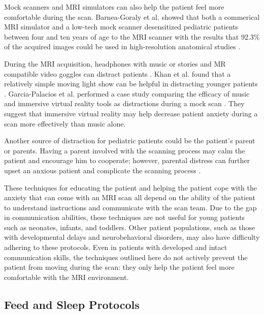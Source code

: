 Mock scanners and MRI simulators can also help the patient feel more comfortable during the scan. Barnea-Goraly et al. showed that both a commerical MRI simulator and a low-tech mock scanner desensitized pediatric patients between four and ten years of age to the MRI scanner with the results that 92.3\% of the acquired images could be used in high-resolution anatomical studies \cite{Barnea-Goraly2014}. 

During the MRI acquisition, headphones with music or stories and MR compatible video goggles can distract patients \cite{Alexander2012} \cite{Barnea-Goraly2014} \cite{Harned2001}. Khan et al. found that a relatively simple moving light show can be helpful in distracting younger patients \cite{Khan2007}. Garcia-Palacios et al. performed a case study comparing the efficacy of music and immersive virtual reality tools as distractions during a mock scan \cite{Garcia-Palacios2007}. They suggest that immersive virtual reality may help decrease patient anxiety during a scan more effectively than music alone. %

Another source of distraction for pediatric patients could be the patient's parent or parents. Having a parent involved with the scanning process may calm the patient and encourage him to cooperate; however, parental distress can further upset an anxious patient and complicate the scanning process \cite{Alexander2012}. 

These techniques for educating the patient and helping the patient cope with the anxiety that can come with an MRI scan all depend on the ability of the patient to understand instructions and communicate with the scan team. Due to the gap in communication abilities, these techniques are not useful for young patients such as neonates, infants, and toddlers. Other patient populations, such as those with developmental delays and neurobehavioral disorders, may also have difficulty adhering to these protocols. Even in patients with developed and intact communication skills, the techniques outlined here do not actively prevent the patient from moving during the scan: they only help the patient feel more comfortable with the MRI environment.

\subsection{Feed and Sleep Protocols}

